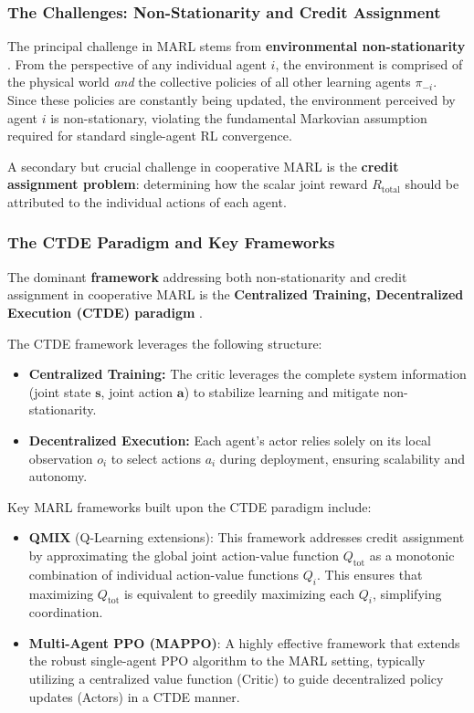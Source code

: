 \documentclass[conference]{IEEEtran}
\begin{document}
\subsubsection{The Challenges: Non-Stationarity and Credit Assignment}

The principal challenge in MARL stems from \textbf{environmental non-stationarity} \cite{perolatMultiagentReinforcementLearning2017}. From the perspective of any individual agent $i$, the environment is comprised of the physical world \textit{and} the collective policies of all other learning agents $\pi_{-i}$. Since these policies are constantly being updated, the environment perceived by agent $i$ is non-stationary, violating the fundamental Markovian assumption required for standard single-agent RL convergence.

A secondary but crucial challenge in cooperative MARL is the \textbf{credit assignment problem}: determining how the scalar joint reward $R_{\text{total}}$ should be attributed to the individual actions of each agent.

\subsubsection{The CTDE Paradigm and Key Frameworks}

The dominant \textbf{framework} addressing both non-stationarity and credit assignment in cooperative MARL is the \textbf{Centralized Training, Decentralized Execution (CTDE) paradigm} \cite{loweMultiAgentActorCriticMixed2020}.

The CTDE framework leverages the following structure:
\begin{itemize}
    \item \textbf{Centralized Training:} The critic leverages the complete system information (joint state $\mathbf{s}$, joint action $\mathbf{a}$) to stabilize learning and mitigate non-stationarity.
    \item \textbf{Decentralized Execution:} Each agent's actor relies solely on its local observation $o_i$ to select actions $a_i$ during deployment, ensuring scalability and autonomy.
\end{itemize}

Key MARL frameworks built upon the CTDE paradigm include:
\begin{itemize}
    \item \textbf{QMIX} (Q-Learning extensions): This framework \cite{rashidQMIXMonotonicValue2018a} addresses credit assignment by approximating the global joint action-value function $Q_{\text{tot}}$ as a monotonic combination of individual action-value functions $Q_i$. This ensures that maximizing $Q_{\text{tot}}$ is equivalent to greedily maximizing each $Q_i$, simplifying coordination.
    \item \textbf{Multi-Agent PPO (MAPPO)}: A highly effective framework \cite{yuSurprisingEffectivenessPPO2022} that extends the robust single-agent PPO algorithm to the MARL setting, typically utilizing a centralized value function (Critic) to guide decentralized policy updates (Actors) in a CTDE manner.
\end{itemize}
\end{document}

